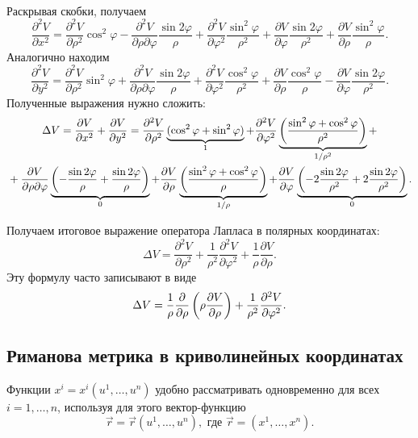 \begin{solution}
\begin{multline*}
	\end{multline*}
	Раскрывая скобки, получаем
	\[
		\frac{\partial^2V}{\partial x^2} = \frac{\partial^2V}{\partial\rho^2}\cos^2\varphi - \frac{\partial^2V}{\partial\rho\partial\varphi}\frac{\sin 2\varphi}{\rho} + \frac{\partial^2V}{\partial\varphi^2}\frac{\sin^2\varphi}{\rho^2} + \frac{\partial V}{\partial\varphi}\frac{\sin 2\varphi}{\rho^2} + \frac{\partial V}{\partial\rho}\frac{\sin^2\varphi}{\rho}.
	\]
	Аналогично находим
	\[
		\frac{\partial^2V}{\partial y^2} = \frac{\partial^2 V}{\partial\rho^2}\sin^2\varphi + \frac{\partial^2V}{\partial\rho\partial\varphi}\frac{\sin 2\varphi}{\rho} + \frac{\partial^2V}{\partial\varphi^2}\frac{\cos^2\varphi}{\rho^2} + \frac{\partial V}{\partial\rho}\frac{\cos^2\varphi}{\rho} - \frac{\partial V}{\partial\varphi}\frac{\sin 2\varphi}{\rho^2}.
	\]
	Полученные выражения нужно сложить:
	\begin{multline*}
		\Delta V = \frac{\partial V}{\partial x^2} + \frac{\partial V}{\partial y^2} = \frac{\partial^2 V}{\partial\rho^2}\underbrace{(\cos^2\varphi + \sin^2\varphi)}_{1} + \frac{\partial^2V}{\partial\varphi^2}\underbrace{\left(\frac{\sin^2\varphi + \cos^2\varphi}{\rho^2}\right)}_{1 / \rho^2} + {}\\{} + \frac{\partial V}{\partial\rho\partial\varphi}\underbrace{\left(-\frac{\sin 2\varphi}{\rho} + \frac{\sin 2\varphi}{\rho}\right)}_{0} + \frac{\partial V}{\partial\rho}\underbrace{\left(\frac{\sin^2\varphi + \cos^2\varphi}{\rho}\right)}_{1 / \rho} + \frac{\partial V}{\partial\varphi}\underbrace{\left(-2\frac{\sin 2\varphi}{\rho^2} + 2\frac{\sin 2\varphi}{\rho^2}\right)}_{0}.
	\end{multline*}

	\noindent
	Получаем итоговое выражение оператора Лапласа в полярных координатах:
	\[
		\Delta V = \frac{\partial^2V}{\partial\rho^2} + \frac{1}{\rho^2}\frac{\partial^2V}{\partial\varphi^2} + \frac{1}{\rho}\frac{\partial V}{\partial\rho}.
	\]
	Эту формулу часто записывают в виде
	\[
		\Delta V = \frac{1}{\rho}\frac{\partial}{\partial\rho}\left(\rho\frac{\partial V}{\partial{\rho}}\right) + \frac{1}{\rho^2}\frac{\partial^2V}{\partial\varphi^2}.
	\]
\end{solution}

\vspace{-.3cm}\subsection{Риманова метрика в криволинейных координатах}

Функции $x^i = x^i(u^1, \ldots, u^n)$ удобно рассматривать одновременно для всех $i = 1, \ldots, n$, используя для этого вектор-функцию
\[
	\vec{r} = \vec{r}(u^1, \ldots, u^n),\text{ где $\vec{r} = (x^1, \ldots, x^n)$}.
\]

